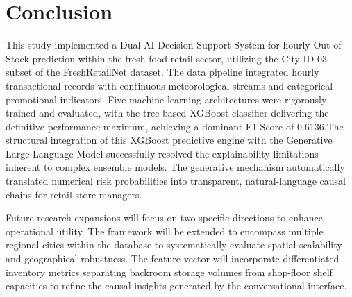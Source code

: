 \documentclass[11pt, a4paper]{article}
\begin{document}
\section{Conclusion}

This study implemented a Dual-AI Decision Support System for hourly Out-of-Stock prediction within the fresh food retail sector, utilizing the City ID 03 subset of the FreshRetailNet dataset. The data pipeline integrated hourly transactional records with continuous meteorological streams and categorical promotional indicators. Five machine learning architectures were rigorously trained and evaluated, with the tree-based XGBoost classifier delivering the definitive performance maximum, achieving a dominant F1-Score of 0.6136.The structural integration of this XGBoost predictive engine with the Generative Large Language Model successfully resolved the explainability limitations inherent to complex ensemble models. The generative mechanism automatically translated numerical risk probabilities into transparent, natural-language causal chains for retail store managers. 

Future research expansions will focus on two specific directions to enhance operational utility. The framework will be extended to encompass multiple regional cities within the database to systematically evaluate spatial scalability and geographical robustness. The feature vector will incorporate differentiated inventory metrics separating backroom storage volumes from shop-floor shelf capacities to refine the causal insights generated by the conversational interface.
\end{document}
